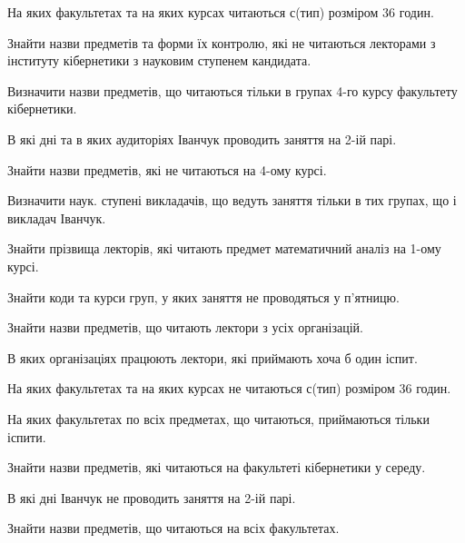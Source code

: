 \begin{card}
    \item На яких факультетах  та на яких курсах читаються с (тип) розміром 36 годин.
    \item Знайти назви предметів та форми їх контролю, які не читаються лекторами з інституту кібернетики з науковим ступенем кандидата.
    \item Визначити назви предметів, що читаються тільки в групах 4-го курсу факультету кібернетики.
\end{card}

\begin{card}
    \item В які дні та в яких аудиторіях Іванчук проводить заняття на 2-ій парі.
    \item Знайти назви предметів, які не читаються на 4-ому курсі.
    \item Визначити наук. ступені викладачів, що ведуть заняття тільки в тих групах, що і викладач Іванчук.
\end{card}

\begin{card}
    \item Знайти прізвища лекторів, які читають предмет математичний аналіз на 1-ому курсі.
    \item Знайти коди та курси груп, у яких заняття не проводяться у п'ятницю.
    \item Знайти назви предметів, що читають лектори з усіх організацій.
\end{card}

\begin{card}
    \item В яких організаціях працюють лектори, які приймають хоча б один іспит.
    \item На яких факультетах  та на яких курсах не читаються с (тип) розміром 36 годин.
    \item На яких факультетах по всіх предметах, що читаються, приймаються тільки іспити.  
\end{card}

\begin{card}
    \item Знайти назви предметів, які читаються на факультеті кібернетики у середу.
    \item В які дні Іванчук не проводить заняття на 2-ій парі.
    \item Знайти назви предметів, що читаються на всіх факультетах.
\end{card}


